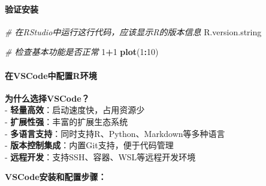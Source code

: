 \documentclass[
  twoside]{book}
\newenvironment{Shaded}{\begin{snugshade}}{\end{snugshade}}
\newcommand{\CommentTok}[1]{\textcolor[rgb]{0.56,0.35,0.01}{\textit{#1}}}
\newcommand{\DecValTok}[1]{\textcolor[rgb]{0.00,0.00,0.81}{#1}}
\newcommand{\FunctionTok}[1]{\textcolor[rgb]{0.13,0.29,0.53}{\textbf{#1}}}
\newcommand{\NormalTok}[1]{#1}
\newcommand{\SpecialCharTok}[1]{\textcolor[rgb]{0.81,0.36,0.00}{\textbf{#1}}}
\begin{document}
\hypertarget{ux9a8cux8bc1ux5b89ux88c5}{%
\paragraph{验证安装}\label{ux9a8cux8bc1ux5b89ux88c5}}

\begin{Shaded}
\begin{Highlighting}[]
\CommentTok{\# 在RStudio中运行这行代码，应该显示R的版本信息}
\NormalTok{R.version.string}

\CommentTok{\# 检查基本功能是否正常}
\DecValTok{1}\SpecialCharTok{+}\DecValTok{1}
\FunctionTok{plot}\NormalTok{(}\DecValTok{1}\SpecialCharTok{:}\DecValTok{10}\NormalTok{)}
\end{Highlighting}
\end{Shaded}

\hypertarget{ux5728vscodeux4e2dux914dux7f6erux73afux5883}{%
\paragraph{在VSCode中配置R环境}\label{ux5728vscodeux4e2dux914dux7f6erux73afux5883}}

\textbf{为什么选择VSCode？}\\
- \textbf{轻量高效}：启动速度快，占用资源少\\
- \textbf{扩展性强}：丰富的扩展生态系统\\
- \textbf{多语言支持}：同时支持R、Python、Markdown等多种语言\\
- \textbf{版本控制集成}：内置Git支持，便于代码管理\\
- \textbf{远程开发}：支持SSH、容器、WSL等远程开发环境

\textbf{VSCode安装和配置步骤：}
\end{document}
